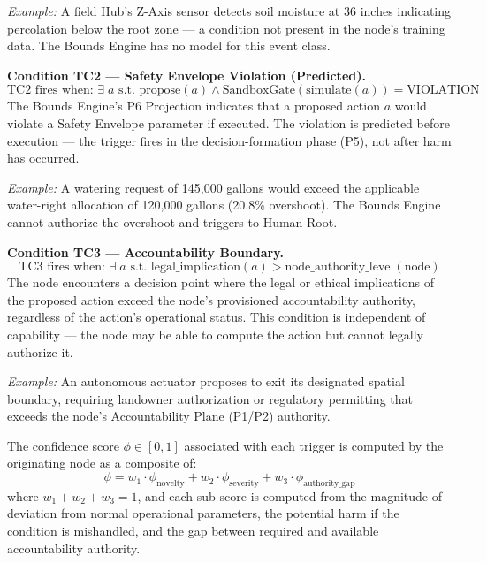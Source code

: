 \textit{Example:} A field Hub's Z-Axis sensor detects soil moisture at 36 inches indicating percolation below the root zone — a condition not present in the node's training data. The Bounds Engine has no model for this event class.

\bigskip
\noindent\textbf{Condition TC2 — Safety Envelope Violation (Predicted).}
\begin{equation}
\text{TC2 fires when: } \exists\; a \text{ s.t. } \text{propose}(a) \land \text{SandboxGate}(\text{simulate}(a)) = \text{VIOLATION}
\end{equation}
The Bounds Engine's P6 Projection indicates that a proposed action $a$ would violate a Safety Envelope parameter if executed. The violation is predicted before execution — the trigger fires in the decision-formation phase (P5), not after harm has occurred.

\textit{Example:} A watering request of 145,000 gallons would exceed the applicable water-right allocation of 120,000 gallons (20.8\% overshoot). The Bounds Engine cannot authorize the overshoot and triggers to Human Root.

\bigskip
\noindent\textbf{Condition TC3 — Accountability Boundary.}
\begin{equation}
\text{TC3 fires when: } \exists\; a \text{ s.t. } \text{legal\_implication}(a) > \text{node\_authority\_level}(\text{node})
\end{equation}
The node encounters a decision point where the legal or ethical implications of the proposed action exceed the node's provisioned accountability authority, regardless of the action's operational status. This condition is independent of capability — the node may be able to compute the action but cannot legally authorize it.

\textit{Example:} An autonomous actuator proposes to exit its designated spatial boundary, requiring landowner authorization or regulatory permitting that exceeds the node's Accountability Plane (P1/P2) authority.

\bigskip
The confidence score $\phi \in [0,1]$ associated with each trigger is computed by the originating node as a composite of:
\begin{equation}
\phi = w_1 \cdot \phi_{\text{novelty}} + w_2 \cdot \phi_{\text{severity}} + w_3 \cdot \phi_{\text{authority\_gap}}
\end{equation}
where $w_1 + w_2 + w_3 = 1$, and each sub-score is computed from the magnitude of deviation from normal operational parameters, the potential harm if the condition is mishandled, and the gap between required and available accountability authority.

